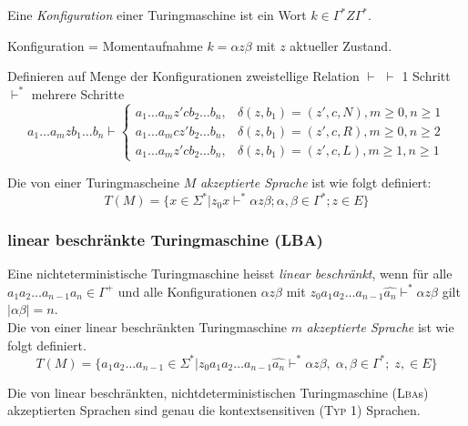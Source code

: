 \documentclass{scrartcl}
\begin{document}
\begin{shaded}
    Eine \emph{Konfiguration} einer Turingmaschine ist ein Wort $k\in\Gamma^* Z\Gamma^*$.
\end{shaded}
{\tiny Konfiguration = Momentaufnahme $k=\alpha z\beta$ mit $z$ aktueller Zustand.}
\begin{shaded}
    Definieren auf Menge der Konfigurationen zweistellige Relation $\vdash$
    {\tiny $\vdash$ 1 Schritt \\ $\vdash^*$ mehrere Schritte }
    \[ a_1\dots a_mzb_1\dots b_n\vdash
    \begin{cases}
        a_1\dots a_mz'cb_2\dots b_n, & \delta(z,b_1)=(z',c,N), m\geq0, n\geq1 \\
        a_1\dots a_mcz'b_2\dots b_n, & \delta(z,b_1)=(z',c,R), m\geq0, n\geq2 \\
        a_1\dots a_mz'cb_2\dots b_n, & \delta(z,b_1)=(z',c,L), m\geq1, n\geq1
    \end{cases}
     \]
\end{shaded}

\begin{shaded}
    Die von einer Turingmascheine $M$ \emph{akzeptierte Sprache} ist wie folgt definiert: \[ T(M)=\{x\in\Sigma^* | z_0x\vdash^*\alpha z\beta; \alpha,\beta\in\Gamma^*; z\in E\} \]
\end{shaded}

\subsubsection*{linear beschränkte Turingmaschine (LBA)}
\begin{shaded}
    Eine nichteterministische Turingmaschine heisst \emph{linear beschränkt}, wenn für alle $a_1a_2\dots a_{n-1}a_n\in\Gamma^+$ und alle Konfigurationen $\alpha z\beta$ mit $z_0a_1a_2\dots a_{n-1}\hat{a_n}\vdash^*\alpha z\beta$ gilt $|\alpha\beta|=n$.\\
    Die von einer linear beschränkten Turingmaschine $m$ \emph{akzeptierte Sprache} ist wie folgt definiert.
    \[
    T(M) = \{a_1a_2\dots a_{n-1}\in\Sigma^* | z_0a_1a_2\dots a_{n-1}\hat{a_n}\vdash^*\alpha z\beta,\; \alpha,\beta\in\Gamma^*; \;z,\in E\}
    \]
\end{shaded}

\begin{shaded}
    Die von linear beschränkten, nichtdeterministischen Turingmaschine (\textsc{Lba}s) akzeptierten Sprachen sind genau die kontextsensitiven (\textsc{Typ} 1) Sprachen.
\end{shaded}
\end{document}
